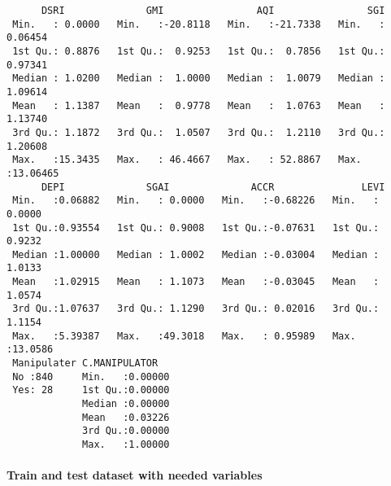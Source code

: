 \documentclass[11pt]{article}
\begin{document}
    
    \begin{verbatim}
      DSRI              GMI                AQI                SGI          
 Min.   : 0.0000   Min.   :-20.8118   Min.   :-21.7338   Min.   : 0.06454  
 1st Qu.: 0.8876   1st Qu.:  0.9253   1st Qu.:  0.7856   1st Qu.: 0.97341  
 Median : 1.0200   Median :  1.0000   Median :  1.0079   Median : 1.09614  
 Mean   : 1.1387   Mean   :  0.9778   Mean   :  1.0763   Mean   : 1.13740  
 3rd Qu.: 1.1872   3rd Qu.:  1.0507   3rd Qu.:  1.2110   3rd Qu.: 1.20608  
 Max.   :15.3435   Max.   : 46.4667   Max.   : 52.8867   Max.   :13.06465  
      DEPI              SGAI              ACCR               LEVI        
 Min.   :0.06882   Min.   : 0.0000   Min.   :-0.68226   Min.   : 0.0000  
 1st Qu.:0.93554   1st Qu.: 0.9008   1st Qu.:-0.07631   1st Qu.: 0.9232  
 Median :1.00000   Median : 1.0002   Median :-0.03004   Median : 1.0133  
 Mean   :1.02915   Mean   : 1.1073   Mean   :-0.03045   Mean   : 1.0574  
 3rd Qu.:1.07637   3rd Qu.: 1.1290   3rd Qu.: 0.02016   3rd Qu.: 1.1154  
 Max.   :5.39387   Max.   :49.3018   Max.   : 0.95989   Max.   :13.0586  
 Manipulater C.MANIPULATOR    
 No :840     Min.   :0.00000  
 Yes: 28     1st Qu.:0.00000  
             Median :0.00000  
             Mean   :0.03226  
             3rd Qu.:0.00000  
             Max.   :1.00000  
    \end{verbatim}

    
    \hypertarget{train-and-test-dataset-with-needed-variables}{%
\paragraph{Train and test dataset with needed
variables}\label{train-and-test-dataset-with-needed-variables}}
\end{document}
